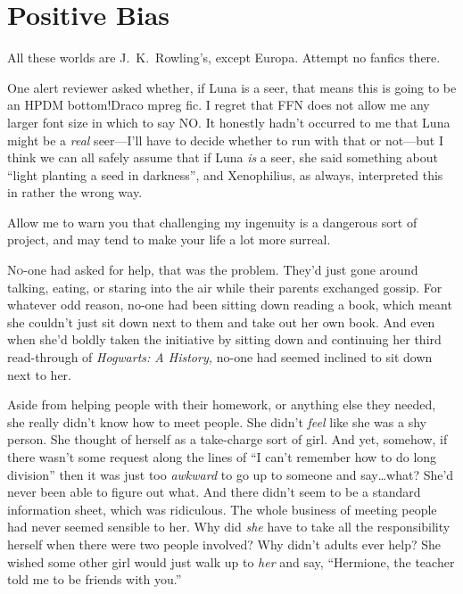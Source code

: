 \chapter{Positive Bias}

\begin{chapterOpeningAuthorNote}
All these worlds are J.~K.~Rowling’s, except Europa. Attempt no fanfics there.

One alert reviewer asked whether, if Luna is a seer, that means this is going to be an HPDM bottom!Draco mpreg fic. I regret that FFN does not allow me any larger font size in which to say NO. It honestly hadn’t occurred to me that Luna might be a \emph{real} seer—I'll have to decide whether to run with that or not—but I think we can all safely assume that if Luna \emph{is} a seer, she said something about “light planting a seed in darkness”, and Xenophilius, as always, interpreted this in rather the wrong way.
\end{chapterOpeningAuthorNote}
\begin{chapterOpeningQuote}
Allow me to warn you that challenging my ingenuity is a dangerous sort of project, and may tend to make your life a lot more surreal.
\end{chapterOpeningQuote}

\lettrine{N}{o}-one had asked for help, that was the problem. They’d just gone around talking, eating, or staring into the air while their parents exchanged gossip. For whatever odd reason, no-one had been sitting down reading a book, which meant she couldn’t just sit down next to them and take out her own book. And even when she’d boldly taken the initiative by sitting down and continuing her third read-through of \emph{Hogwarts: A History,} no-one had seemed inclined to sit down next to her.

Aside from helping people with their homework, or anything else they needed, she really didn’t know how to meet people. She didn’t \emph{feel} like she was a shy person. She thought of herself as a take-charge sort of girl. And yet, somehow, if there wasn’t some request along the lines of “I can’t remember how to do long division” then it was just too \emph{awkward} to go up to someone and say…what? She’d never been able to figure out what. And there didn’t seem to be a standard information sheet, which was ridiculous. The whole business of meeting people had never seemed sensible to her. Why did \emph{she} have to take all the responsibility herself when there were two people involved? Why didn’t adults ever help? She wished some other girl would just walk up to \emph{her} and say, “Hermione, the teacher told me to be friends with you.”

